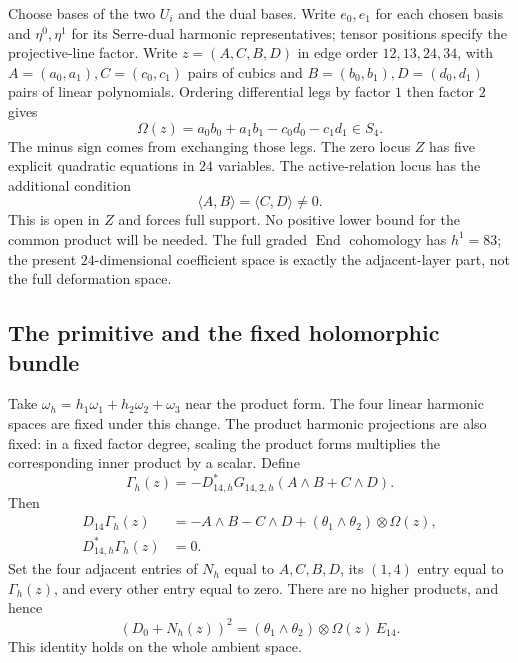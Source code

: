 \documentclass[11pt]{amsart}
\theoremstyle{definition}
\theoremstyle{remark}
\newcommand{\End}{\operatorname{End}}
\begin{document}
Choose bases of the two $U_i$ and the dual bases. Write $e_0,e_1$ for
each chosen basis and $\eta^0,\eta^1$ for its Serre-dual harmonic
representatives; tensor positions specify the projective-line factor. Write
$z=(A,C,B,D)$ in edge order $12,13,24,34$, with
$A=(a_0,a_1),C=(c_0,c_1)$ pairs of cubics and
$B=(b_0,b_1),D=(d_0,d_1)$ pairs of linear polynomials.
Ordering differential legs by factor $1$ then factor $2$ gives
\begin{equation}\label{eq:diamond-omega}
 \Omega(z)=a_0b_0+a_1b_1-c_0d_0-c_1d_1\in S_4.
\end{equation}
The minus sign comes from exchanging those legs. The zero locus $Z$ has
five explicit quadratic equations in $24$ variables. The active-relation
locus has the additional condition
\begin{equation}\label{eq:active-relation}
 \langle A,B\rangle=\langle C,D\rangle\ne0.
\end{equation}
This is open in $Z$ and forces full support. No positive lower bound for
the common product will be needed. The full graded $\End$ cohomology has
$h^1=83$; the present $24$-dimensional coefficient space is exactly the
adjacent-layer part, not the full deformation space.

\subsection{The primitive and the fixed holomorphic bundle}
Take $\omega_h=h_1\omega_1+h_2\omega_2+\omega_3$ near the product
form. The four linear harmonic spaces are fixed under this change.
The product harmonic projections are also fixed: in a fixed factor degree,
scaling the product forms multiplies the corresponding inner product by
a scalar. Define
\begin{equation}\label{eq:diamond-gamma}
 \Gamma_h(z)=-D_{14,h}^*G_{14,2,h}(A\wedge B+C\wedge D).
\end{equation}
Then
\begin{align}
 D_{14}\Gamma_h(z)
  &=-A\wedge B-C\wedge D+(\theta_1\wedge\theta_2)\otimes\Omega(z),
       \label{eq:diamond-hodge}\\
 D_{14,h}^*\Gamma_h(z)&=0.\nonumber
\end{align}
Set the four adjacent entries of $N_h$ equal to $A,C,B,D$, its
$(1,4)$ entry equal to $\Gamma_h(z)$, and every other entry equal to
zero. There are no higher products, and hence
\begin{equation}\label{eq:diamond-curvature}
 (D_0+N_h(z))^2=(\theta_1\wedge\theta_2)\otimes\Omega(z)\,E_{14}.
\end{equation}
This identity holds on the whole ambient space.
\end{document}
